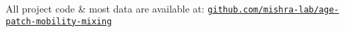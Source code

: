 \printbibliography
\footnotesize\medskip\par
All project code \& most data are available at:
\href{http://github.com/mishra-lab/age-patch-mobility-mixing}{\texttt{github.com/mishra-lab/age-patch-mobility-mixing}}
